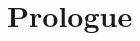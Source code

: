 
\chapter{Prologue} %

\label{Chapter0} %


\newcommand{\keyword}[1]{\textbf{#1}}
\newcommand{\tabhead}[1]{\textbf{#1}}
\newcommand{\code}[1]{\texttt{#1}}
\newcommand{\file}[1]{\texttt{\bfseries#1}}
\newcommand{\option}[1]{\texttt{\itshape#1}}







